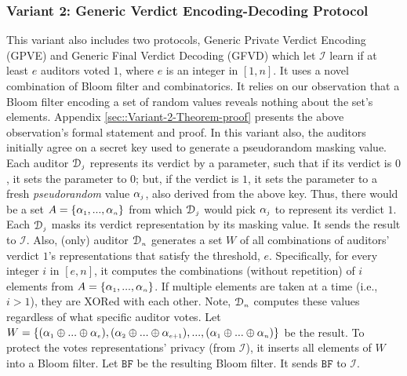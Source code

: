 \subsubsection{Variant 2: Generic Verdict  Encoding-Decoding Protocol} This variant also includes two protocols, Generic Private Verdict Encoding (GPVE) and Generic Final Verdict Decoding (GFVD) which let $\mathcal{I}$ learn if at least $e$ auditors voted $1$, where $e$ is an integer in  $[1, n]$. It uses a novel combination of   Bloom filter and combinatorics. It relies on our observation that a Bloom filter encoding a set of random values reveals nothing about the set's elements.  Appendix \ref{sec::Variant-2-Theorem-proof} presents the above observation's formal statement and proof.  
%
In this variant  also, the auditors initially agree on a secret key  used  to  generate a pseudorandom masking value. Each auditor $\mathcal{D}_{\scriptscriptstyle j}$ represents its verdict by a parameter, such that if its verdict is $0$,   it  sets the parameter to  $0$; but, if   the verdict is $1$, it sets the parameter to a fresh \emph{pseudorandom} value $\alpha_{\scriptscriptstyle j}$, also derived from the above key. Thus, there would be a set $A=\{\alpha_{\scriptscriptstyle 1},..., \alpha_{\scriptscriptstyle n}\}$ from which   $\mathcal{D}_{\scriptscriptstyle j}$ would pick $\alpha_{\scriptscriptstyle j}$ to represent its verdict $1$. Each $\mathcal{D}_{\scriptscriptstyle j}$ masks its verdict representation by its masking  value. It sends the result to $\mathcal{I}$. Also, (only) auditor $\mathcal{D}_{\scriptscriptstyle n}$  generates a set $W$  of all  combinations of auditors' verdict $1$'s representations that satisfy the threshold, $e$.  Specifically,  for every integer $i$ in $[e, n]$, it computes the combinations (without repetition) of $i$ elements from  $A=\{\alpha_{\scriptscriptstyle 1},..., \alpha_{\scriptscriptstyle n}\}$. If  multiple elements are taken at a time (i.e., $i>1$), they are XORed with each other.   Note, $\mathcal{D}_{\scriptscriptstyle n}$ computes these values    regardless of what specific  auditor  votes.   Let $W=\{(\alpha_{\scriptscriptstyle 1}\oplus ... \oplus \alpha_{\scriptscriptstyle e}),  (\alpha_{\scriptscriptstyle 2}\oplus  ... \oplus \alpha_{\scriptscriptstyle e+1}), ..., (\alpha_{\scriptscriptstyle 1}\oplus ... \oplus \alpha_{\scriptscriptstyle n})\}$ be the result. To protect   the votes representations' privacy (from $\mathcal{I}$), it inserts all elements of $W$ into a Bloom filter. Let $\mathtt{BF}$ be the resulting Bloom filter. It sends $\mathtt{BF}$ to $\mathcal{I}$. 


